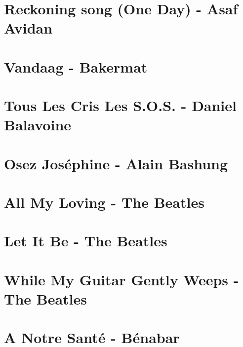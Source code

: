 \documentclass[11pt]{article}
\begin{document}
\section{Reckoning song (One Day) - Asaf Avidan}
\begin{guitar}

\end{guitar}


\section{Vandaag - Bakermat}
\begin{guitar}

\end{guitar}


\section{Tous Les Cris Les S.O.S. - Daniel Balavoine}
\begin{guitar}

\end{guitar}

\section{Osez Joséphine - Alain Bashung}
\begin{guitar}

\end{guitar}



\section{All My Loving - The Beatles}


\section{Let It Be - The Beatles}
\begin{guitar}

\end{guitar}

\section{While My Guitar Gently Weeps - The Beatles}




\section{A Notre Santé - Bénabar}

\end{document}
